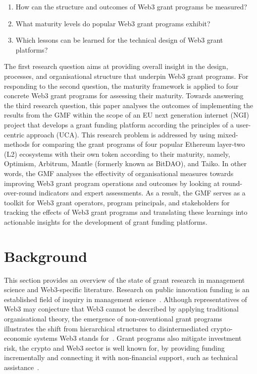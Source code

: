 \documentclass[conference]{IEEEtran}
\begin{document}
\begin{enumerate}
\item How can the structure and outcomes of Web3 grant programs be measured?
\item What maturity levels do popular Web3 grant programs exhibit?
\item Which lessons can be learned for the technical design of Web3 grant platforms?
\end{enumerate}

The first research question aims at providing overall insight in the design, processes, and organisational structure that underpin Web3 grant programs. For responding to the second question, the maturity framework  is applied to four concrete Web3 grant programs for assessing their maturity. Towards answering the third research question, this paper analyses the outcomes of implementing the results from the GMF within the scope of an EU next generation internet (NGI) project that develops a grant funding platform according the principles of a user-centric approach (UCA). This research problem is addressed by using mixed-methods for comparing the grant programs of four popular Ethereum layer-two (L2) ecosystems with their own token according to their maturity, namely, Optimism, Arbitrum, Mantle (formerly known as BitDAO), and Taiko. In other words, the GMF analyses the effectivity of organisational measures towards improving Web3 grant program operations and outcomes by looking at round-over-round indicators and expert assessments. As a result, the GMF serves as a toolkit for Web3 grant operators, program principals, and stakeholders for tracking the effects of Web3 grant programs and translating these learnings into actionable insights for the development of grant funding platforms.

\section{Background}\label{sec_2}

This section provides an overview of the state of grant research in management science and Web3-specific literature. Research on public innovation funding is an established field of inquiry in management science~\cite{albors_impact_2011,bartle_review_2003}. Although representatives of Web3 may conjecture that Web3 cannot be described by applying traditional organisational theory, the emergence of non-onventional grant programs illustrates the shift from hierarchical structures to disintermediated crypto-economic systems Web3 stands for~\cite[p.~501]{shermin_disrupting_2017}. Grant programs also mitigate investment risk, the crypto and Web3 sector is well known for, by providing funding incrementally and connecting it with non-financial support, such as technical assistance~\cite[p.~6]{gilbert_sustainable_2019}.
\end{document}

